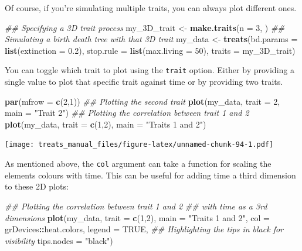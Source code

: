 \documentclass[
]{book}
\newenvironment{Shaded}{\begin{snugshade}}{\end{snugshade}}
\newcommand{\CommentTok}[1]{\textcolor[rgb]{0.56,0.35,0.01}{\textit{#1}}}
\newcommand{\DataTypeTok}[1]{\textcolor[rgb]{0.13,0.29,0.53}{#1}}
\newcommand{\DecValTok}[1]{\textcolor[rgb]{0.00,0.00,0.81}{#1}}
\newcommand{\FloatTok}[1]{\textcolor[rgb]{0.00,0.00,0.81}{#1}}
\newcommand{\KeywordTok}[1]{\textcolor[rgb]{0.13,0.29,0.53}{\textbf{#1}}}
\newcommand{\NormalTok}[1]{#1}
\newcommand{\OperatorTok}[1]{\textcolor[rgb]{0.81,0.36,0.00}{\textbf{#1}}}
\newcommand{\OtherTok}[1]{\textcolor[rgb]{0.56,0.35,0.01}{#1}}
\newcommand{\StringTok}[1]{\textcolor[rgb]{0.31,0.60,0.02}{#1}}
\begin{document}
Of course, if you're simulating multiple traits, you can always plot different ones.

\begin{Shaded}
\begin{Highlighting}[]
\CommentTok{\#\# Specifying a 3D trait process}
\NormalTok{my\_3D\_trait \textless{}{-}}\StringTok{ }\KeywordTok{make.traits}\NormalTok{(}\DataTypeTok{n =} \DecValTok{3}\NormalTok{, )}
\CommentTok{\#\# Simulating a birth death tree with that 3D trait}
\NormalTok{my\_data \textless{}{-}}\StringTok{ }\KeywordTok{treats}\NormalTok{(}\DataTypeTok{bd.params =} \KeywordTok{list}\NormalTok{(}\DataTypeTok{extinction =} \FloatTok{0.2}\NormalTok{),}
                \DataTypeTok{stop.rule =} \KeywordTok{list}\NormalTok{(}\DataTypeTok{max.living =} \DecValTok{50}\NormalTok{),}
                \DataTypeTok{traits    =}\NormalTok{ my\_3D\_trait)}
\end{Highlighting}
\end{Shaded}

You can toggle which trait to plot using the \texttt{trait} option.
Either by providing a single value to plot that specific trait against time or by providing two traits.

\begin{Shaded}
\begin{Highlighting}[]
\KeywordTok{par}\NormalTok{(}\DataTypeTok{mfrow =} \KeywordTok{c}\NormalTok{(}\DecValTok{2}\NormalTok{,}\DecValTok{1}\NormalTok{))}
\CommentTok{\#\# Plotting the second trait}
\KeywordTok{plot}\NormalTok{(my\_data, }\DataTypeTok{trait =} \DecValTok{2}\NormalTok{, }\DataTypeTok{main =} \StringTok{"Trait 2"}\NormalTok{)}
\CommentTok{\#\# Plotting the correlation between trait 1 and 2}
\KeywordTok{plot}\NormalTok{(my\_data, }\DataTypeTok{trait =} \KeywordTok{c}\NormalTok{(}\DecValTok{1}\NormalTok{,}\DecValTok{2}\NormalTok{), }\DataTypeTok{main =} \StringTok{"Traits 1 and 2"}\NormalTok{)}
\end{Highlighting}
\end{Shaded}

\texttt{[image: treats\_manual\_files/figure-latex/unnamed-chunk-94-1.pdf]}

As mentioned above, the \texttt{col} argument can take a function for scaling the elements colours with time.
This can be useful for adding time a third dimension to these 2D plots:

\begin{Shaded}
\begin{Highlighting}[]
\CommentTok{\#\# Plotting the correlation between trait 1 and 2}
\CommentTok{\#\# with time as a 3rd dimensions}
\KeywordTok{plot}\NormalTok{(my\_data, }\DataTypeTok{trait =} \KeywordTok{c}\NormalTok{(}\DecValTok{1}\NormalTok{,}\DecValTok{2}\NormalTok{), }\DataTypeTok{main =} \StringTok{"Traits 1 and 2"}\NormalTok{,}
     \DataTypeTok{col =}\NormalTok{ grDevices}\OperatorTok{::}\NormalTok{heat.colors, }\DataTypeTok{legend =} \OtherTok{TRUE}\NormalTok{,}
     \CommentTok{\#\# Highlighting the tips in black for visibility}
     \DataTypeTok{tips.nodes =} \StringTok{"black"}\NormalTok{)}
\end{Highlighting}
\end{Shaded}
\end{document}
